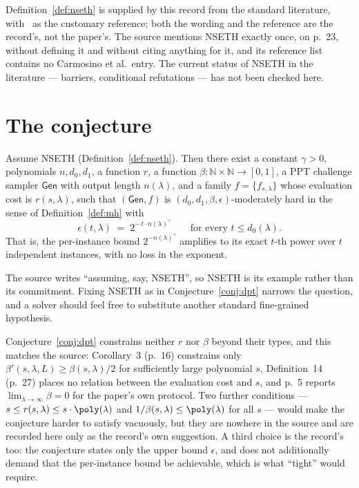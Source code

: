 \documentclass{conjura-conjecture}
\newcommand{\NN}{\mathbb{N}}
\newcommand{\Gen}{\mathsf{Gen}}
\begin{document}
\begin{remark}\label{rem:nseth}
Definition~\ref{def:nseth} is supplied by this record from the standard literature, with~\cite{CGIMPS16} as the customary reference; both the wording and the reference are the record's, not the paper's. The source mentions NSETH exactly once, on p.~23, without defining it and without citing anything for it, and its reference list contains no Carmosino et al.\ entry. The current status of NSETH in the literature --- barriers, conditional refutations --- has not been checked here.
\end{remark}

\section{The conjecture}\label{sec:conjectures}

\begin{conjecture}\label{conj:dpt}
Assume NSETH (Definition~\ref{def:nseth}). Then there exist a constant $\gamma > 0$, polynomials $n, d_0, d_1$, a function $r$, a function $\beta : \NN \times \NN \to [0,1]$, a PPT challenge sampler $\Gen$ with output length $n(\lambda)$, and a family $f = \{f_{s,\lambda}\}$ whose evaluation cost is $r(s,\lambda)$, such that $(\Gen, f)$ is $(d_0,d_1,\beta,\epsilon)$-moderately hard in the sense of Definition~\ref{def:mh} with
\[
\epsilon(t,\lambda) \;=\; 2^{-\,t \cdot n(\lambda)^{\gamma}} \qquad \text{for every } t \le d_0(\lambda).
\]
That is, the per-instance bound $2^{-n(\lambda)^{\gamma}}$ amplifies to its exact $t$-th power over $t$ independent instances, with no loss in the exponent.
\end{conjecture}

\begin{remark}
The source writes ``assuming, say, NSETH'', so NSETH is its example rather than its commitment. Fixing NSETH as in Conjecture~\ref{conj:dpt} narrows the question, and a solver should feel free to substitute another standard fine-grained hypothesis.
\end{remark}

\begin{remark}
Conjecture~\ref{conj:dpt} constrains neither $r$ nor $\beta$ beyond their types, and this matches the source: Corollary~3 (p.~16) constrains only $\beta'(s,\lambda,L) \ge \beta(s,\lambda)/2$ for sufficiently large polynomial $s$, Definition~14 (p.~27) places no relation between the evaluation cost and $s$, and p.~5 reports $\lim_{\lambda \to \infty} \beta = 0$ for the paper's own protocol. Two further conditions --- $s \le r(s,\lambda) \le s \cdot \poly(\lambda)$ and $1/\beta(s,\lambda) \le \poly(\lambda)$ for all $s$ --- would make the conjecture harder to satisfy vacuously, but they are nowhere in the source and are recorded here only as the record's own suggestion. A third choice is the record's too: the conjecture states only the upper bound $\epsilon$, and does not additionally demand that the per-instance bound be achievable, which is what ``tight'' would require.
\end{remark}
\end{document}

